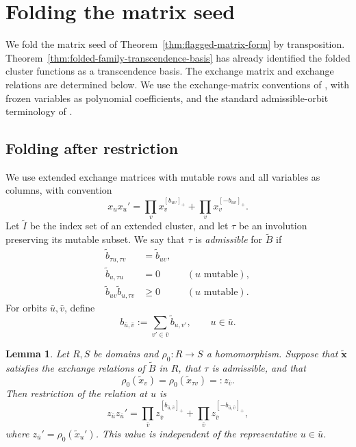 \documentclass[11pt]{amsart}
\newtheorem{lemma}[theorem]{Lemma}
\theoremstyle{definition}
\theoremstyle{remark}
\begin{document}
\section{Folding the matrix seed}
\label{sec:folding}

We fold the matrix seed of Theorem~\ref{thm:flagged-matrix-form} by
transposition.  Theorem~\ref{thm:folded-family-transcendence-basis} has
already identified the folded cluster functions as a transcendence basis.
The exchange matrix and exchange relations are determined below.  We use
the exchange-matrix conventions of \cite{BFZ}, with frozen variables as
polynomial coefficients, and the standard admissible-orbit terminology of
\cite{DupontFolding}.

\subsection{Folding after restriction}
\label{subsec:restriction-folding}

We use extended exchange matrices with mutable rows and all variables as
columns, with convention
\[ x_ux_u' =\prod_vx_v^{[b_{uv}]_+} +\prod_vx_v^{[-b_{uv}]_+}. \]
Let $\widetilde I$ be the index set of an extended cluster, and let $\tau$ be
an involution preserving its mutable subset.  We say that $\tau$ is
\emph{admissible} for $\widetilde B$ if
\begin{align}
 \widetilde b_{\tau u,\tau v}&=\widetilde b_{uv},
 \label{eq:admissible-equivariance}\\
 \widetilde b_{u,\tau u}&=0
 &&(u\text{ mutable}),
 \label{eq:admissible-orbit}\\
 \widetilde b_{uv}\widetilde b_{u,\tau v}&\ge0
 &&(u\text{ mutable}).
 \label{eq:admissible-sign}
\end{align}
For orbits $\bar u,\bar v$, define
\begin{equation}
 b_{\bar u,\bar v}
 :=\sum_{v'\in\bar v}\widetilde b_{u,v'},
 \qquad u\in\bar u.
 \label{eq:orbit-sum}
\end{equation}

\begin{lemma}\label{lem:restriction-folding}
Let $R,S$ be domains and $\rho_0:R\to S$ a homomorphism.  Suppose that
$\widetilde{\mathbf x}$ satisfies the exchange relations of
$\widetilde B$ in $R$, that $\tau$ is admissible, and that
\[ \rho_0(\widetilde x_v)=\rho_0(\widetilde x_{\tau v})=:z_{\bar v}. \]
Then restriction of the relation at $u$ is
\[ z_{\bar u}z_{\bar u}' =\prod_{\bar v}z_{\bar v}^{[b_{\bar u,\bar v}]_+} +\prod_{\bar v}z_{\bar v}^{[-b_{\bar u,\bar v}]_+}, \]
where $z_{\bar u}'=\rho_0(\widetilde x_u')$.  This value is independent of
the representative $u\in\bar u$.
\end{lemma}
\end{document}
